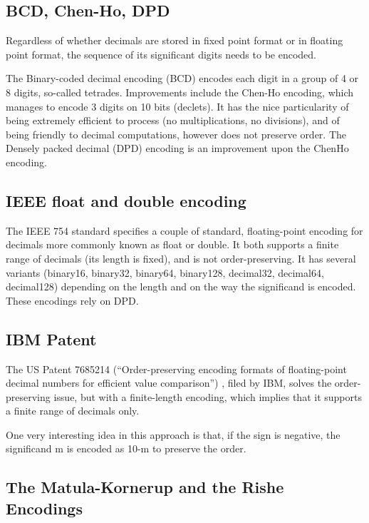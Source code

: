 \documentclass{acm_proc_article-sp}
\begin{document}
\subsection{BCD, Chen-Ho, DPD}

Regardless of whether decimals are stored in fixed point format or in floating point format, the sequence of its significant digits needs to be encoded.

The Binary-coded decimal encoding (BCD) encodes each digit in a group of 4 or 8 digits, so-called tetrades. Improvements include the Chen-Ho \cite{ChenHo} encoding, which manages to encode 3 digits on 10 bits (declets). It has the nice particularity of being extremely efficient to process (no multiplications, no divisions), and of being friendly to decimal computations, however does not preserve order. The Densely packed decimal (DPD) encoding \cite{DPD} is an improvement upon the ChenHo encoding.

\subsection{IEEE float and double encoding}

The IEEE 754 standard specifies a couple of standard, floating-point encoding for decimals more commonly known as float or double. It both supports a finite range of decimals (its length is fixed), and is not order-preserving. It has several variants (binary16, binary32, binary64, binary128, decimal32, decimal64, decimal128) depending on the length and on the way the significand is encoded. These encodings rely on DPD.

\subsection{IBM Patent}
The US Patent 7685214 (``Order-preserving encoding formats of floating-point decimal numbers for efficient value comparison'') , filed by IBM, solves the order-preserving issue, but with a finite-length encoding, which implies that it supports a finite range of decimals only.

One very interesting idea in this approach is that, if the sign is negative, the significand m is encoded as 10-m to preserve the order.

\subsection{The Matula-Kornerup and the Rishe Encodings}
\label{section-rishe}
\end{document}

